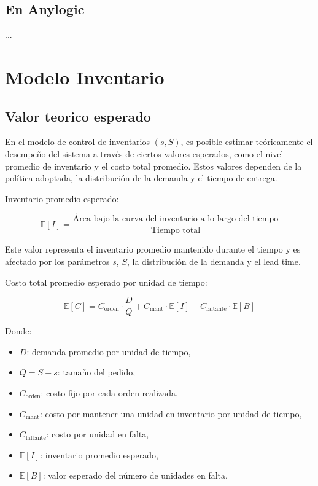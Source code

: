 \documentclass{article}
\begin{document}
\subsection{En Anylogic}
...

\section{Modelo Inventario}

\subsection{Valor teorico esperado}

En el modelo de control de inventarios \((s, S)\), es posible estimar teóricamente el desempeño del sistema a través de ciertos valores esperados, como el nivel promedio de inventario y el costo total promedio. Estos valores dependen de la política adoptada, la distribución de la demanda y el tiempo de entrega.

Inventario promedio esperado:

\[
\mathbb{E}[I] = \frac{\text{Área bajo la curva del inventario a lo largo del tiempo}}{\text{Tiempo total}}
\]

Este valor representa el inventario promedio mantenido durante el tiempo y es afectado por los parámetros \(s\), \(S\), la distribución de la demanda y el lead time.

Costo total promedio esperado por unidad de tiempo:

\[
\mathbb{E}[C] = C_{\text{orden}} \cdot \frac{D}{Q} + C_{\text{mant}} \cdot \mathbb{E}[I] + C_{\text{faltante}} \cdot \mathbb{E}[B]
\]

Donde:
\begin{itemize}
    \item \(D\): demanda promedio por unidad de tiempo,
    \item \(Q = S - s\): tamaño del pedido,
    \item \(C_{\text{orden}}\): costo fijo por cada orden realizada,
    \item \(C_{\text{mant}}\): costo por mantener una unidad en inventario por unidad de tiempo,
    \item \(C_{\text{faltante}}\): costo por unidad en falta,
    \item \(\mathbb{E}[I]\): inventario promedio esperado,
    \item \(\mathbb{E}[B]\): valor esperado del número de unidades en falta.
\end{itemize}
\end{document}
